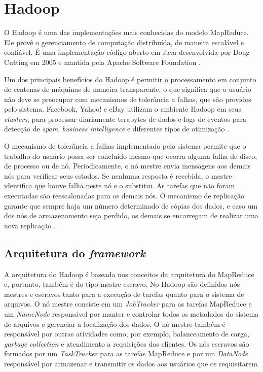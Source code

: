 \section{Hadoop}

O Hadoop é uma das  implementações mais conhecidas do modelo MapReduce. Ele provê o gerenciamento de computação distribuída, de maneira escalável e confiável. É uma implementação código aberto em Java  desenvolvida por Doug Cutting em 2005 e mantida pela Apache Software Foundation \cite{White:2009, Hadoop:2010}.

Um dos principais benefícios do Hadoop é permitir o processamento em conjunto de centenas de máquinas de maneira transparente, o que significa que o usuário não deve se preocupar com mecanismos de tolerância a falhas, que são providos pelo sistema. %
Facebook, Yahoo! e eBay utilizam o ambiente Hadoop em seus \textit{clusters}, para processar diariamente terabytes de dados e logs de eventos para detecção de \textit{spam}, \textit{business intelligence} e diferentes tipos de otimização \cite{Cherkasova:2011}.

O mecanismo de tolerância a falhas implementado pelo sistema permite que o trabalho do usuário possa ser concluído mesmo que ocorra alguma falha de disco, de processo ou de nó. Periodicamente, o nó mestre envia mensagens aos demais nós para verificar seus estados. Se nenhuma resposta é recebida, o mestre identifica que houve falha neste nó e o substitui. 
As tarefas que não foram executadas são reescalonadas para os demais nós. O mecanismo de replicação garante que sempre haja um número determinado de cópias dos dados, e caso um dos nós de armazenamento seja perdido, os demais se encarregam de realizar uma nova replicação \cite{White:2009}.

\subsection{Arquitetura do \textit{framework}}

A arquitetura do Hadoop é baseada nos conceitos da arquitetura do MapReduce e, portanto, também é do tipo mestre-escravo. No Hadoop são definidos nós mestres e escravos tanto para a execução de tarefas quanto para o sistema de arquivos.
O nó mestre consiste em um \textit{JobTracker}  para as tarefas MapReduce e um \textit{NameNode}  responsável por manter e controlar todos os metadados do sistema de arquivos e gerenciar a localização dos dados. O nó mestre também é responsável por outras atividades como, por exemplo, balanceamento de carga, \textit{garbage collection} e atendimento a requisições dos clientes.
Os nós escravos são formados por um \textit{TaskTracker}  para as tarefas MapReduce e por um \textit{DataNode} responsável por armazenar e transmitir os dados aos usuários que os requisitarem.

